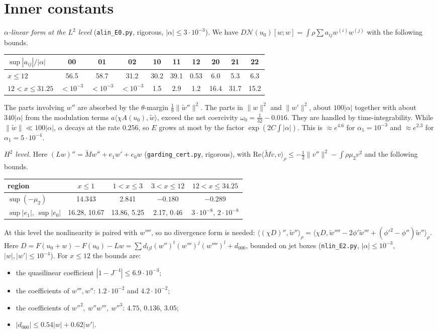 \documentclass[11pt]{amsart}
\theoremstyle{remark}
\newcommand{\ip}[2]{\langle #1,#2\rangle}
\begin{document}
\section{Inner constants}
\emph{$\alpha$-linear form at the $L^2$ level} (\texttt{alin\_E0.py}, rigorous, $|\alpha|\le3\cdot10^{-3}$). We have $D\mathcal N(u_0)[w;w]=\int\rho\sum a_{ij}w^{(i)}w^{(j)}$ with the following bounds.
\begin{center}
\begin{tabular}{@{}l|ccccccccc@{}}
$\sup|a_{ij}|/|\alpha|$ & 00 & 01 & 02 & 10 & 11 & 12 & 20 & 21 & 22\\ \hline
$x\le12$ & 56.5 & 58.7 & 31.2 & 30.2 & 39.1 & 0.53 & 6.0 & 5.3 & 6.3\\
$12<x\le31.25$ & $<10^{-3}$ & $<10^{-3}$ & $<10^{-3}$ & 1.5 & 2.9 & 1.2 & 16.4 & 31.7 & 15.2
\end{tabular}
\end{center}
The parts involving $w''$ are absorbed by the $\theta$-margin $\frac19\|\tilde w''\|^2$. The parts in $\|w\|^2$ and $\|w'\|^2$, about $100|\alpha|$ together with about $340|\alpha|$ from the modulation terms $a\ip{\chi A(u_0)}{\tilde w}$, exceed the net coercivity $\omega_0=\frac1{32}-0.016$. They are handled by time-integrability. While $\|\tilde w\|\ll100|\alpha|$, $\alpha$ decays at the rate $0.256$, so $E$ grows at most by the factor $\exp(2C\int|\alpha|)$. This is $\approx e^{4.6}$ for $\alpha_1=10^{-3}$ and $\approx e^{2.3}$ for $\alpha_1=5\cdot10^{-4}$.

\emph{$H^2$ level.} Here $(Lw)''=\tilde M w''+e_1w'+e_0w$ (\texttt{garding\_cert.py}, rigorous), with $\mathrm{Re}\ip{\tilde Mv}{v}_\rho\le-\frac12\|v''\|^2-\int\rho\mu_2v^2$ and the following bounds.
\begin{center}
\begin{tabular}{@{}l|cccc@{}}
region & $x\le1$ & $1<x\le3$ & $3<x\le12$ & $12<x\le34.25$\\ \hline
$\sup(-\mu_2)$ & 14.343 & 2.841 & $-0.180$ & $-0.289$\\
$\sup|e_1|$, $\sup|e_0|$ & 16.28, 10.67 & 13.86, 5.25 & 2.17, 0.46 & $3\cdot10^{-8}$, $2\cdot10^{-8}$
\end{tabular}
\end{center}
At this level the nonlinearity is paired with $w''''$, so no divergence form is needed: $\ip{(\chi D)''}{\tilde w''}_\rho=\ip{\chi D}{\tilde w''''-2\phi'\tilde w'''+(\phi'^2-\phi'')\tilde w''}_\rho$. Here $D=F(u_0+w)-F(u_0)-Lw=\sum d_{tjl}(w'')^t(w''')^j(w'''')^l+d_{000}$, bounded on jet boxes (\texttt{nlin\_E2.py}, $|\alpha|\le10^{-3}$, $|w|,|w'|\le10^{-4}$). For $x\le12$ the bounds are:
\begin{itemize}
\item the quasilinear coefficient $|1-J^{-4}|\le6.9\cdot10^{-3}$;
\item the coefficients of $w''',w''$: $1.2\cdot10^{-2}$ and $4.2\cdot10^{-2}$;
\item the coefficients of $w''^2,\ w''w''',\ w''^3$: $4.75$, $0.136$, $3.05$;
\item $|d_{000}|\le0.54|w|+0.62|w'|$.
\end{itemize}
\end{document}

